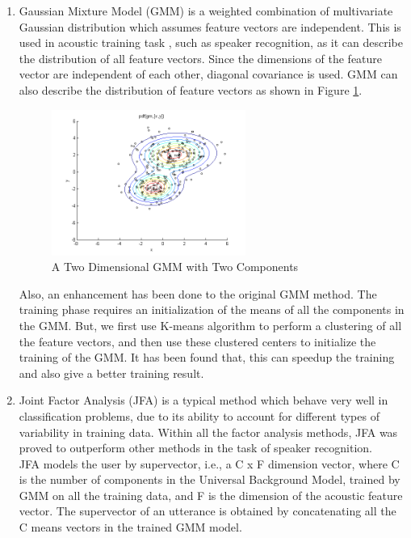 \begin{enumerate}
    \item Gaussian Mixture Model (GMM) is a weighted combination of multivariate Gaussian distribution which assumes feature vectors are independent. This is used in acoustic training task , such as speaker recognition, as it can describe the distribution of all feature vectors. Since the dimensions of the feature vector are independent of each other, diagonal covariance is used.  GMM can also describe the distribution of feature vectors as shown in Figure \ref{fig:GMM_fig_one}. \\

  \begin{figure}[!t]
  \centering
  \includegraphics[width=2.5in]{./gmm.png}
  \caption{A Two Dimensional GMM with Two Components}
  \label{fig:GMM_fig_one}
  \end{figure}

  Also, an enhancement has been done to the original GMM method. The training phase requires an initialization of the means of all the components in the GMM. But, we first use K-means algorithm to perform a clustering of all the feature vectors, and then use these clustered centers to initialize the training of the GMM. It has been found that, this can speedup the training and also give a better training result.
  \item Joint Factor Analysis (JFA) is a typical method which behave very well in classification problems, due to its ability to account for different types of variability in training data. Within all the factor analysis methods, JFA was proved to outperform other methods in the task of speaker recognition. \\  JFA models the user by supervector, i.e., a C x F dimension vector, where C is the number of components in the Universal Background Model, trained by GMM on all the training data, and F is the dimension of the acoustic feature vector. The supervector of an utterance is obtained by concatenating all the C means vectors in the trained GMM model.
\end{enumerate}
